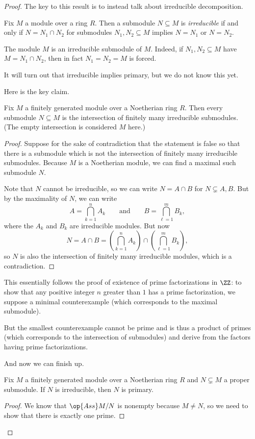 \begin{proof}
	The key to this result is to instead talk about irreducible decomposition.
	\begin{definition}[Irreducible]
		Fix $M$ a module over a ring $R$. Then a submodule $N\subseteq M$ is \textit{irreducible} if and only if $N=N_1\cap N_2$ for submodules $N_1,N_2\subseteq M$ implies $N=N_1$ or $N=N_2$.
	\end{definition}
	\begin{example} \label{ex:totalisirred}
		The module $M$ is an irreducible submodule of $M$. Indeed, if $N_1,N_2\subseteq M$ have $M=N_1\cap N_2$, then in fact $N_1=N_2=M$ is forced.
	\end{example}
	It will turn out that irreducible implies primary, but we do not know this yet.

	Here is the key claim.
	\begin{lemma}
		Fix $M$ a finitely generated module over a Noetherian ring $R$. Then every submodule $N\subseteq M$ is the intersection of finitely many irreducible submodules. (The empty intersection is considered $M$ here.)
	\end{lemma}
	\begin{proof}
		Suppose for the sake of contradiction that the statement is false so that there is a submodule which is not the intersection of finitely many irreducible submodules. Because $M$ is a Noetherian module, we can find a maximal such submodule $N$.

		Note that $N$ cannot be irreducible, so we can write $N=A\cap B$ for $N\subsetneq A,B$. But by the maximality of $N$, we can write
		\[A=\bigcap_{k=1}^nA_k\qquad\text{and}\qquad B=\bigcap_{\ell=1}^mB_k,\]
		where the $A_k$ and $B_k$ are irreducible modules. But now
		\[N=A\cap B=\left(\bigcap_{k=1}^nA_k\right)\cap\left(\bigcap_{\ell=1}^mB_k\right),\]
		so $N$ is also the intersection of finitely many irreducible modules, which is a contradiction.
	\end{proof}
	\begin{remark}[Nir]
		This essentially follows the proof of existence of prime factorizations in $\ZZ$: to show that any positive integer $n$ greater than $1$ has a prime factorization, we suppose a minimal counterexample (which corresponds to the maximal submodule).
		
		But the smallest counterexample cannot be prime and is thus a product of primes (which corresponds to the intersection of submodules) and derive from the factors having prime factorizations.
	\end{remark}
	And now we can finish up.
	\begin{lemma}
		Fix $M$ a finitely generated module over a Noetherian ring $R$ and $N\subsetneq M$ a proper submodule. If $N$ is irreducible, then $N$ is primary.
	\end{lemma}
	\begin{proof}
		We know that $\op{Ass}M/N$ is nonempty because $M\ne N$, so we need to show that there is exactly one prime.
		

\end{proof}
\end{proof}
